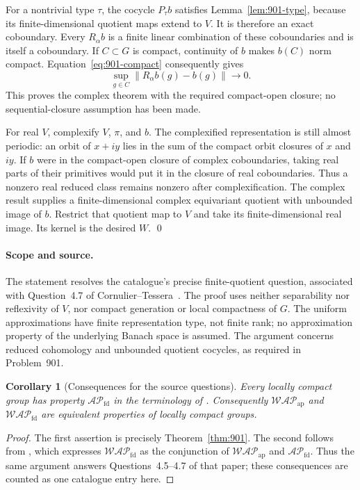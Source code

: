 \documentclass[11pt,a4paper]{article}
\newtheorem{corollary}[theorem]{Corollary}
\theoremstyle{remark}
\begin{document}
For a nontrivial type $\tau$, the cocycle $P_\tau b$ satisfies
Lemma~\ref{lem:901-type}, because its finite-dimensional quotient maps
extend to $V$. It is therefore an exact coboundary. Every $R_\alpha b$ is
a finite linear combination of these coboundaries and is itself a
coboundary. If $C\subset G$ is compact, continuity of $b$ makes $b(C)$
norm compact. Equation~\eqref{eq:901-compact} consequently gives
\[
 \sup_{g\in C}\|R_\alpha b(g)-b(g)\|\longrightarrow0.
\]
This proves the complex theorem with the required compact-open closure;
no sequential-closure assumption has been made.

For real $V$, complexify $V$, $\pi$, and $b$. The complexified representation
is still almost periodic: an orbit of $x+iy$ lies in the sum of the compact
orbit closures of $x$ and $iy$. If $b$ were in the compact-open closure of
complex coboundaries, taking real parts of their primitives would put it
in the closure of real coboundaries. Thus a nonzero real reduced class
remains nonzero after complexification. The complex result supplies a
finite-dimensional complex equivariant quotient with unbounded image of
$b$. Restrict that quotient map to $V$ and take its finite-dimensional
real image. Its kernel is the desired $W$. \qed

\paragraph{Scope and source.}
The statement resolves the catalogue's precise finite-quotient question,
associated with Question~4.7 of Cornulier--Tessera~\cite{CT2020}.
The proof uses neither separability nor reflexivity of $V$, nor compact
generation or local compactness of $G$. The uniform approximations have
finite representation type, not finite rank; no approximation property
of the underlying Banach space is assumed. The argument concerns reduced
cohomology and unbounded quotient cocycles, as required in Problem~901.


\begin{corollary}[Consequences for the source questions]
Every locally compact group has property $\mathcal{AP}_{\mathrm{fd}}$
in the terminology of \cite[Definition~4.1]{CT2020}. Consequently
$\mathcal{WAP}_{\mathrm{ap}}$ and $\mathcal{WAP}_{\mathrm{fd}}$ are equivalent
properties of locally compact groups.
\end{corollary}
\begin{proof}
The first assertion is precisely Theorem~\ref{thm:901}. The second
follows from \cite[Proposition~4.3]{CT2020}, which expresses
$\mathcal{WAP}_{\mathrm{fd}}$ as the conjunction of
$\mathcal{WAP}_{\mathrm{ap}}$ and $\mathcal{AP}_{\mathrm{fd}}$.
Thus the same argument answers Questions~4.5--4.7 of that paper;
these consequences are counted as one catalogue entry here.
\end{proof}
\end{document}
